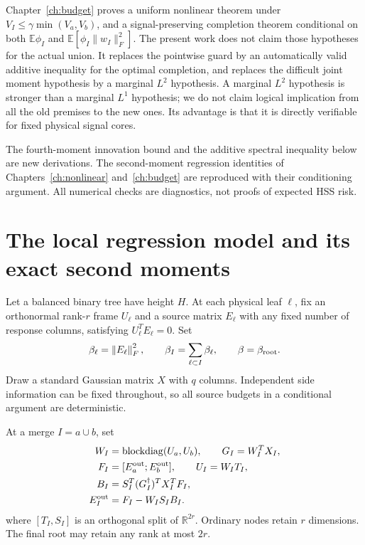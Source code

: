 \documentclass[11pt,oneside,openany,a4paper]{book}
\numberwithin{equation}{chapter}
\theoremstyle{definition}
\theoremstyle{remark}
\newcommand{\R}{\mathbb R}\newcommand{\E}{\mathbb E}\newcommand{\Prb}{\mathbb P}\newcommand{\PP}{\mathbb P}
\newcommand{\F}[1]{\left\lVert#1\right\rVert_F}
\DeclareMathOperator{\diag}{blockdiag}\DeclareMathOperator{\range}{range}
\begin{document}
Chapter~\ref{ch:budget} proves a uniform nonlinear theorem under $V_I\le\gamma\min(V_a,V_b)$, and a signal-preserving completion theorem conditional on both $\E\phi_I$ and $\E[\phi_I\|w_I\|_F^2]$. The present work does not claim those hypotheses for the actual union. It replaces the pointwise guard by an automatically valid additive inequality for the optimal completion, and replaces the difficult joint moment hypothesis by a marginal $L^2$ hypothesis. A marginal $L^2$ hypothesis is stronger than a marginal $L^1$ hypothesis; we do not claim logical implication from all the old premises to the new ones. Its advantage is that it is directly verifiable for fixed physical signal cores.

The fourth-moment innovation bound and the additive spectral inequality below are new derivations. The second-moment regression identities of Chapters~\ref{ch:nonlinear} and~\ref{ch:budget} are reproduced with their conditioning argument. All numerical checks are diagnostics, not proofs of expected HSS risk.

\section{The local regression model and its exact second moments}\label{core:sec:model}
Let a balanced binary tree have height $H$. At each physical leaf $\ell$, fix an orthonormal rank-$r$ frame $U_\ell$ and a source matrix $E_\ell$ with any fixed number of response columns, satisfying $U_\ell^TE_\ell=0$. Set
\[
 \beta_\ell=\F{E_\ell}^2,\qquad
 \beta_I=\sum_{\ell\subset I}\beta_\ell,\qquad \beta=\beta_{\rm root}.
\]
Draw a standard Gaussian matrix $X$ with $q$ columns. Independent side information can be fixed throughout, so all source budgets in a conditional argument are deterministic.

At a merge $I=a\cup b$, set
\begin{equation}\label{core:eq:model}
 \begin{split}
 W_I&=\diag(U_a,U_b),\qquad G_I=W_I^TX_I,\\
 F_I&=[E_a^{\rm out};E_b^{\rm out}],\qquad U_I=W_IT_I,\\
 B_I&=S_I^T(G_I^\dagger)^TX_I^TF_I,\\
 E_I^{\rm out}&=F_I-W_IS_IB_I.
 \end{split}
\end{equation}
where $[T_I,S_I]$ is an orthogonal split of $\R^{2r}$. Ordinary nodes retain $r$ dimensions. The final root may retain any rank at most $2r$.
\end{document}
